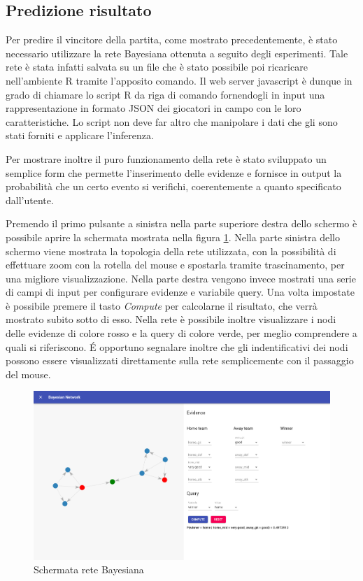 \documentclass[hidelinks, 12pt]{article}
\begin{document}
\subsection{Predizione risultato}

Per predire il vincitore della partita, come mostrato precedentemente, è stato necessario utilizzare la rete Bayesiana ottenuta a seguito degli esperimenti. Tale rete è stata infatti salvata su un file che è stato possibile poi ricaricare nell'ambiente R tramite l'apposito comando. Il web server javascript è dunque in grado di chiamare lo script R da riga di comando fornendogli in input una rappresentazione in formato JSON dei giocatori in campo con le loro caratteristiche. Lo script non deve far altro che manipolare i dati che gli sono stati forniti e applicare l'inferenza.

Per mostrare inoltre il puro funzionamento della rete è stato sviluppato un semplice form che permette l'inserimento delle evidenze e fornisce in output la probabilità che un certo evento si verifichi, coerentemente a quanto specificato dall'utente.

Premendo il primo pulsante a sinistra nella parte superiore destra dello schermo è possibile aprire la schermata mostrata nella figura \ref{fig:inference_view}. Nella parte sinistra dello schermo viene mostrata la topologia della rete utilizzata, con la possibilità di effettuare zoom con la rotella del mouse e spostarla tramite trascinamento, per una migliore visualizzazione. Nella parte destra vengono invece mostrati una serie di campi di input per configurare evidenze e variabile query. Una volta impostate è possibile premere il tasto {\it Compute} per calcolarne il risultato, che verrà mostrato subito sotto di esso. Nella rete è possibile inoltre visualizzare i nodi delle evidenze di colore rosso e la query di colore verde, per meglio comprendere a quali si riferiscono. \'E opportuno segnalare inoltre che gli indentificativi dei nodi possono essere visualizzati direttamente sulla rete semplicemente con il passaggio del mouse.

\begin{figure}[H]
	\centering
	\includegraphics[scale=0.35]{images/07_03_inference.png}
	\caption[Schermata rete Bayesiana]{Schermata rete Bayesiana}
	\label{fig:inference_view}
\end{figure}
\end{document}

